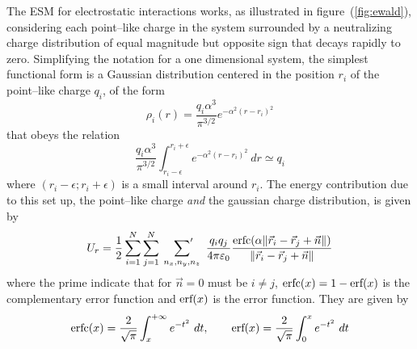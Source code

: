 The \ac{ESM} for electrostatic interactions works, as illustrated in figure~(\ref{fig:ewald}), considering each
point--like charge in the system surrounded by a neutralizing charge distribution of equal magnitude but opposite
sign that decays rapidly to zero. Simplifying the notation for a one dimensional system, the simplest functional
form is a Gaussian distribution centered in the position $r_i$ of the point--like charge $q_i$, of the form
\begin{equation}
	\rho_i(r) = \frac{q_i\alpha^3}{\pi^{3/2}}e^{-\alpha^2 (r - r_i)^2}
\end{equation}
that obeys the relation
\begin{equation*}
	\frac{q_i\alpha^3}{\pi^{3/2}}\int_{r_i-\epsilon}^{r_i+\epsilon}e^{-\alpha^2 (r - r_i)^2}\ dr \simeq q_i
\end{equation*}
where $(r_i-\epsilon; r_i+\epsilon)$ is a small interval around $r_i$. The energy contribution due to this set
up, the point--like charge \textit{and} the gaussian charge distribution, is given by
\begin{equation}
	U_r = \frac{1}{2}\sum_{i=1}^N\sum_{j=1}^N\ \sideset{}{'}\sum_{n_x,n_y,n_z}\ \frac{q_iq_j}{4 \pi \varepsilon_0} \frac{\erfc{(\alpha \| \vec r_i - \vec r_j + \vec n \|)}}{\| \vec r_i - \vec r_j + \vec n \|}
	\label{eq:ewaldReal}
\end{equation}
where the prime indicate that for $\vec n = 0$ must be $i\ne j$, $\text{erfc}(x) = 1-\text{erf}(x)$ is the complementary
error function and $\text{erf}(x)$ is the error function. They are given by
\begin{equation}
	\text{erfc}(x) = \frac{2}{\sqrt{\pi}}\int_{x}^{+\infty} e^{-t^2}\ dt, \qquad \text{erf}(x) = \frac{2}{\sqrt{\pi}}\int_{0}^{x} e^{-t^2}\ dt
	\label{eq:erf}
\end{equation}

